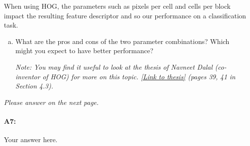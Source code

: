 When using HOG, the parameters such as pixels per cell and cells per block impact the resulting feature descriptor and so our performance on a classification task.
\begin{enumerate}[(b)]
\item What are the pros and cons of the two parameter combinations? Which might you expect to have better performance?

\emph{Note: You may find it useful to look at the thesis of Navneet Dalal (co-inventor of HOG) for more on this topic. \href{http://lear.inrialpes.fr/people/dalal/NavneetDalalThesis.pdf}{[Link to thesis]} (pages 39, 41 in Section 4.3).}

\end{enumerate}

\emph{Please answer on the next page.}


\pagebreak
\paragraph{A7:} Your answer here.





% 






